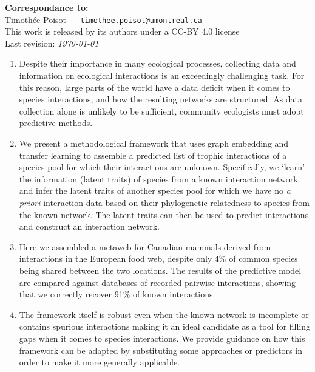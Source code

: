 \documentclass[11pt]{article}
\begin{document}
\textbf{Correspondance to:}\\
Timothée Poisot --- \texttt{timothee.poisot@umontreal.ca}\\

\vfill
This work is released by its authors under a CC-BY 4.0 license\hfill\ccby\\
Last revision: \emph{\today}

\clearpage
\thispagestyle{empty}

\vfill

\begin{enumerate}
    \item Despite their importance in many ecological processes,
collecting data and information on ecological interactions is an
exceedingly challenging task. For this reason, large parts of the world
have a data deficit when it comes to species interactions, and how the
resulting networks are structured. As data collection alone is unlikely
to be sufficient, community ecologists must adopt predictive methods.%
    \item We present a methodological framework that uses graph
embedding and transfer learning to assemble a predicted list of trophic
interactions of a species pool for which their interactions are unknown.
Specifically, we `learn' the information (latent traits) of species from
a known interaction network and infer the latent traits of another
species pool for which we have no \emph{a priori} interaction data based
on their phylogenetic relatedness to species from the known network. The
latent traits can then be used to predict interactions and construct an
interaction network.%
    \item Here we assembled a metaweb for Canadian mammals derived from
interactions in the European food web, despite only 4\% of common
species being shared between the two locations. The results of the
predictive model are compared against databases of recorded pairwise
interactions, showing that we correctly recover 91\% of known
interactions.%
    \item The framework itself is robust even when the known network is
incomplete or contains spurious interactions making it an ideal
candidate as a tool for filling gaps when it comes to species
interactions. We provide guidance on how this framework can be adapted
by substituting some approaches or predictors in order to make it more
generally applicable.%
\end{enumerate}


\vfill
\end{document}
